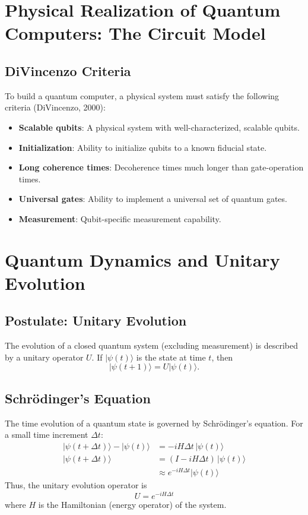 \documentclass{book}
\begin{document}
\section{Physical Realization of Quantum Computers: The Circuit Model}

\subsection*{DiVincenzo Criteria}
To build a quantum computer, a physical system must satisfy the following criteria (DiVincenzo, 2000):
\begin{itemize}
    \item \textbf{Scalable qubits}: A physical system with well-characterized, scalable qubits.
    \item \textbf{Initialization}: Ability to initialize qubits to a known fiducial state.
    \item \textbf{Long coherence times}: Decoherence times much longer than gate-operation times.
    \item \textbf{Universal gates}: Ability to implement a universal set of quantum gates.
    \item \textbf{Measurement}: Qubit-specific measurement capability.
\end{itemize}

\section{Quantum Dynamics and Unitary Evolution}

\subsection*{Postulate: Unitary Evolution}
The evolution of a closed quantum system (excluding measurement) is described by a unitary operator $U$. If $|\psi(t)\rangle$ is the state at time $t$, then
\[
|\psi(t+1)\rangle = U|\psi(t)\rangle.
\]

\subsection*{Schrödinger's Equation}
The time evolution of a quantum state is governed by Schrödinger's equation. For a small time increment $\Delta t$:
\begin{align*}
|\psi(t+\Delta t)\rangle - |\psi(t)\rangle &= -iH\Delta t\,|\psi(t)\rangle \\
|\psi(t+\Delta t)\rangle &= (I - iH\Delta t)\,|\psi(t)\rangle \\
&\approx e^{-iH\Delta t}|\psi(t)\rangle
\end{align*}
Thus, the unitary evolution operator is
\[
U = e^{-iH\Delta t}
\]
where $H$ is the Hamiltonian (energy operator) of the system.
\end{document}
